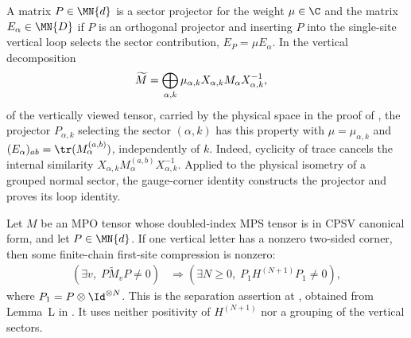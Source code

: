\begin{definition}
    \label{def:mpdo_sector_projector}
    \leanok
    A matrix $P\in\MN{d}$ is a sector projector for the weight
    $\mu\in\C$ and the matrix $E_\alpha\in\MN{D}$ if $P$ is an orthogonal
    projector and inserting $P$ into the single-site vertical loop selects
    the sector contribution, $E_P=\mu E_\alpha$.
    In the vertical decomposition
    \begin{align}
        \widetilde M
         & =\bigoplus_{\alpha,k}
        \mu_{\alpha,k}X_{\alpha,k}M_\alpha X_{\alpha,k}^{-1},
        \notag
    \end{align}
    of the vertically viewed tensor, carried by the
    physical space in the proof of
    \cite[Proposition~4.13]{Cirac2016MPDO_arXiv}, the projector
    $P_{\alpha,k}$ selecting the sector $(\alpha,k)$ has this property with
    $\mu=\mu_{\alpha,k}$ and
    $(E_\alpha)_{ab}=\tr(M_\alpha^{(a,b)})$, independently of $k$. Indeed,
    cyclicity of trace cancels the internal similarity
    $X_{\alpha,k}M_\alpha^{(a,b)}X_{\alpha,k}^{-1}$. Applied to the physical
    isometry of a grouped normal sector, the gauge-corner identity constructs
    the projector and proves its loop identity.
\end{definition}

\begin{lemma}
    \label{thm:cpsv_literal_sector_compression_nonzero}
    \leanok
    Let $M$ be an MPO tensor whose doubled-index MPS tensor is in CPSV
    canonical form, and let $P\in\MN{d}$. If one vertical letter has a nonzero
    two-sided corner, then some finite-chain first-site compression is nonzero:
    \begin{align}
        \left(\exists v,\;P\widetilde M_vP\ne0\right)
         & \Longrightarrow
        \left(\exists N\geq0,\;P_1H^{(N+1)}P_1\ne0\right),
        \label{eq:cpsv_literal_sector_compression_separation}
    \end{align}
    where $P_1=P\otimes\Id^{\otimes N}$. This is the separation assertion at
    \cite[Proposition~4.13, line~1898]{Cirac2016MPDO_arXiv}, obtained from
    Lemma~L in \cite[Appendix~C.3, lines~1835--1858]{Cirac2016MPDO_arXiv}.
    It uses neither positivity of $H^{(N+1)}$ nor a grouping of the vertical
    sectors.
\end{lemma}

